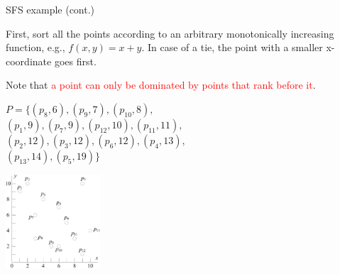 \documentclass{beamer}
\def\vgap{\vspace{5mm}}
\newcommand{\red}[1]{\textcolor{red}{#1}}
\begin{document}
    \begin{frame}{SFS example (cont.)}
    \begin{small} \label{fra:sfs-sort}
        First, sort all the points according to an arbitrary monotonically increasing function, e.g., $f(x, y) = x + y$. In case of a tie, the point with a smaller x-coordinate goes first.

		\vgap

		Note that \red{a point can only be dominated by points that rank before it}.

		\vgap

        \begin{minipage}[b]{0.5\linewidth}
            $P = \{(p_8, 6), (p_9, 7), (p_{10}, 8),$ \\
            $(p_1, 9), (p_7, 9), (p_{12}, 10), (p_{11}, 11),$ \\
            $(p_2, 12), (p_3, 12), (p_6, 12), (p_4, 13),$ \\
            $(p_{13}, 14), (p_5, 19)\}$ \vspace{10mm}
        \end{minipage}
        \begin{minipage}[b]{0.45\linewidth}
            \begin{center}
                \includegraphics[height=35mm]{./artwork/data.pdf}
            \end{center}
        \end{minipage}
    \end{small}
    \end{frame}
\end{document}
